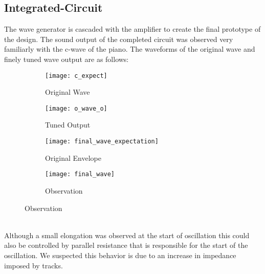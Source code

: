 \subsection{Integrated-Circuit}
The wave generator is cascaded with the amplifier to create the final prototype of the design. The sound output of the completed circuit was observed very familiarly with the c-wave of the piano. The waveforms of the original wave and finely tuned wave output are as follows:
\begin{figure}[h]
    \begin{subfigure}{.48\columnwidth}
    \centering
    \texttt{[image: c\_expect]}
    \caption*{Original Wave}
    \end{subfigure}
    \begin{subfigure}{.48\columnwidth}
        \centering
        \texttt{[image: o\_wave\_o]}
        \caption*{Tuned Output}
    \end{subfigure}
    \newline
    \begin{subfigure}{.48\columnwidth}
        \centering
    \texttt{[image: final\_wave\_expectation]}
    \caption*{Original Envelope}
\end{subfigure}
\begin{subfigure}{.48\columnwidth}
    \centering
    \texttt{[image: final\_wave]}
    \caption*{Observation}
\end{subfigure}
\end{figure}
\\
Although a small elongation was observed at the start of oscillation this could also be controlled by parallel resistance that is responsible for the start of the oscillation. We suspected this behavior is due to an increase in impedance imposed by tracks.